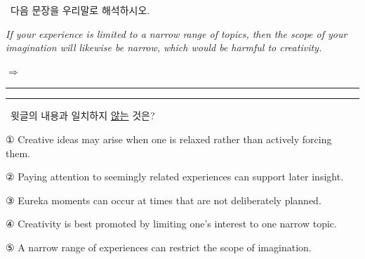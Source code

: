 \documentclass[11pt,a4paper]{article}
\newcommand{\qno}[1]{\par\vspace{8pt}\noindent{\sffamily\bfseries #1.}\ }
\newcommand{\instr}[1]{{\sffamily #1}\par\vspace{3pt}}
\begin{document}
\qno{3}\instr{[서술형] 다음 문장을 우리말로 해석하시오.}
\vspace{4pt}\par\noindent
\hspace{1em}\textit{If your experience is limited to a narrow range of topics, then the scope of your imagination will likewise be narrow, which would be harmful to creativity.}
\par\vspace{6pt}\noindent
$\Rightarrow$ \rule{\linewidth}{0.4pt}
\par\vspace{4pt}\noindent
\rule{\linewidth}{0.4pt}

\qno{4}\instr{윗글의 내용과 일치하지 \underline{않는} 것은?}
\begin{choices}
\item ① Creative ideas may arise when one is relaxed rather than actively forcing them.
\item ② Paying attention to seemingly related experiences can support later insight.
\item ③ Eureka moments can occur at times that are not deliberately planned.
\item ④ Creativity is best promoted by limiting one's interest to one narrow topic.
\item ⑤ A narrow range of experiences can restrict the scope of imagination.
\end{choices}
\end{document}
